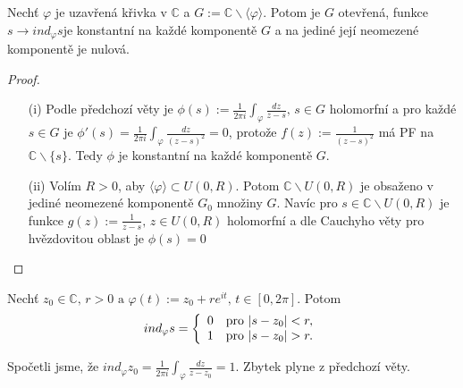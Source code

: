\begin{theorem}
 Nechť $\varphi$ je uzavřená křivka v $\mathbb{C}$ a $G:=\mathbb{C}\backslash\langle\varphi\rangle$. %
Potom je $G$ otevřená, funkce $s\rightarrow ind_{\varphi} s$je konstantní na každé komponentě $G$ a na jediné její neomezené komponentě je nulová. 
\end{theorem}
\begin{proof}
\begin{itemize}
    \item[(i)] Podle předchozí věty je $\phi(s):=\frac{1}{2\pi i}\int_{\varphi}\frac{dz}{z-s}\text{, }s\in G$  %
    holomorfní a pro každé $s\in G$ je $\phi'(s)=\frac{1}{2\pi i}\int_{\varphi}\frac{dz}{(z-s)^2}=0$, protože $f(z):=\frac{1}{(z-s)^2}$ má PF na $\mathbb{C}\backslash\{s\}$. %
    Tedy $\phi$ je konstantní na každé komponentě $G$.
    \item[(ii)]%
    Volím $R>0$, aby $\langle\varphi\rangle\subset U(0,R)$. Potom $\mathbb{C}\backslash U(0,R)$ je obsaženo v jediné neomezené komponentě $G_{0}$ množiny $G$. Navíc pro $s\in\mathbb{C}\backslash U(0,R)$ je funkce $g(z):=\frac{1}{z-s}\text{, }z\in U(0,R)$ holomorfní a dle Cauchyho věty pro hvězdovitou oblast %
    je $\phi(s)=0$
\end{itemize}

\end{proof}

\begin{example}
Nechť $z_{0}\in\mathbb{C}\text{, }r>0\text{ a }\varphi(t):=z_{0}+r e^{it}\text{, }t\in [0,2\pi]$. %
Potom $$ind_{\varphi}s=
\twopartdef
{0}{|s-z_{0}|<r,}  %
{1}{|s-z_{0}|>r.}$$ %

Spočetli jsme, že
$ind_{\varphi}z_{0}=\frac{1}{2\pi i}\int_{\varphi}\frac{dz}{z-z_{0}}=1$.
Zbytek plyne z předchozí věty.
\end{example}